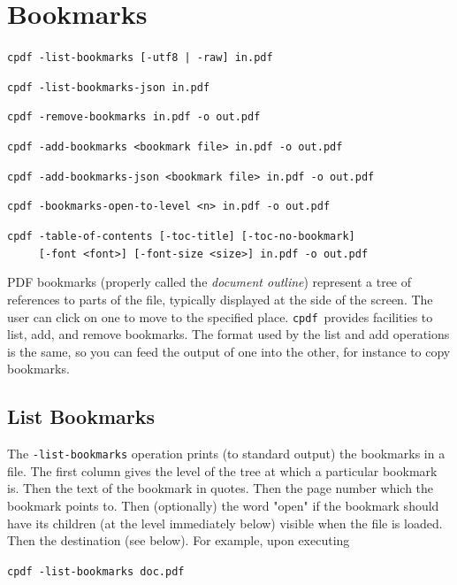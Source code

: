 \documentclass{book}
\newcommand{\cpdf}{\texttt{cpdf}}
\begin{document}
\chapter{Bookmarks}\label{chap:6}
  \begin{framed}
  \small\noindent\verb!cpdf -list-bookmarks [-utf8 | -raw] in.pdf!

  \vspace{1.5mm}
  \small\noindent\verb!cpdf -list-bookmarks-json in.pdf!

  \vspace{1.5mm}
  \small\noindent\verb!cpdf -remove-bookmarks in.pdf -o out.pdf!

  \vspace{1.5mm}
  \small\noindent\verb!cpdf -add-bookmarks <bookmark file> in.pdf -o out.pdf!

  \vspace{1.5mm}
  \small\noindent\verb!cpdf -add-bookmarks-json <bookmark file> in.pdf -o out.pdf!

  \vspace{1.5mm}
  \small\noindent\verb!cpdf -bookmarks-open-to-level <n> in.pdf -o out.pdf!

  \vspace{1.5mm}
  \small\noindent\verb!cpdf -table-of-contents [-toc-title] [-toc-no-bookmark]!\\
  \small\noindent\verb!     [-font <font>] [-font-size <size>] in.pdf -o out.pdf!

  \end{framed}
  PDF bookmarks (properly called the \textit{document outline}) represent a tree
of references to parts of the file, typically displayed at the side of the
screen. The user can click on one to move to the specified place. \cpdf\ provides
facilities to list, add, and remove bookmarks. The format used by the list and
add operations is the same, so you can feed the output of one into the other,
for instance to copy bookmarks.

  \section{List Bookmarks}
  The \texttt{-list-bookmarks} operation prints (to standard output) the
bookmarks in a file. The first column gives the level of the tree at which a
particular bookmark is. Then the text of the bookmark in quotes. Then the page
number which the bookmark points to. Then (optionally) the word "open" if the
bookmark should have its children (at the level immediately below) visible when
the file is loaded. Then the destination (see below). For example, upon executing
\begin{framed}
  \noindent\small\verb!cpdf -list-bookmarks doc.pdf!
\end{framed}
\end{document}
